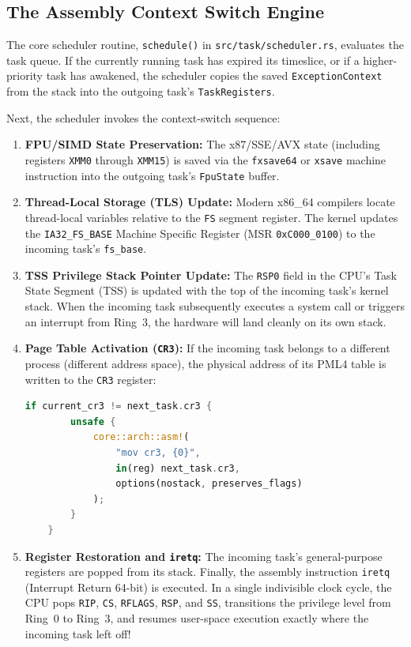 \subsection{The Assembly Context Switch Engine}
The core scheduler routine, \texttt{schedule()} in \texttt{src/task/scheduler.rs}, evaluates the task queue. If the currently running task has expired its timeslice, or if a higher-priority task has awakened, the scheduler copies the saved \texttt{ExceptionContext} from the stack into the outgoing task's \texttt{TaskRegisters}.

Next, the scheduler invokes the context-switch sequence:
\begin{enumerate}
    \item \textbf{FPU/SIMD State Preservation:} The x87/SSE/AVX state (including registers \texttt{XMM0} through \texttt{XMM15}) is saved via the \texttt{fxsave64} or \texttt{xsave} machine instruction into the outgoing task's \texttt{FpuState} buffer.
    \item \textbf{Thread-Local Storage (TLS) Update:} Modern x86\_64 compilers locate thread-local variables relative to the \texttt{FS} segment register. The kernel updates the \texttt{IA32\_FS\_BASE} Machine Specific Register (MSR \texttt{0xC000\_0100}) to the incoming task's \texttt{fs\_base}.
    \item \textbf{TSS Privilege Stack Pointer Update:} The \texttt{RSP0} field in the CPU's Task State Segment (TSS) is updated with the top of the incoming task's kernel stack. When the incoming task subsequently executes a system call or triggers an interrupt from Ring~3, the hardware will land cleanly on its own stack.
    \item \textbf{Page Table Activation (\texttt{CR3}):} If the incoming task belongs to a different process (different address space), the physical address of its PML4 table is written to the \texttt{CR3} register:
    \begin{lstlisting}[language=Rust, caption={Address Space Switch in Assembly}]
    if current_cr3 != next_task.cr3 {
        unsafe {
            core::arch::asm!(
                "mov cr3, {0}",
                in(reg) next_task.cr3,
                options(nostack, preserves_flags)
            );
        }
    }
    \end{lstlisting}
    \item \textbf{Register Restoration and \texttt{iretq}:} The incoming task's general-purpose registers are popped from its stack. Finally, the assembly instruction \texttt{iretq} (Interrupt Return 64-bit) is executed. In a single indivisible clock cycle, the CPU pops \texttt{RIP}, \texttt{CS}, \texttt{RFLAGS}, \texttt{RSP}, and \texttt{SS}, transitions the privilege level from Ring~0 to Ring~3, and resumes user-space execution exactly where the incoming task left off!
\end{enumerate}

